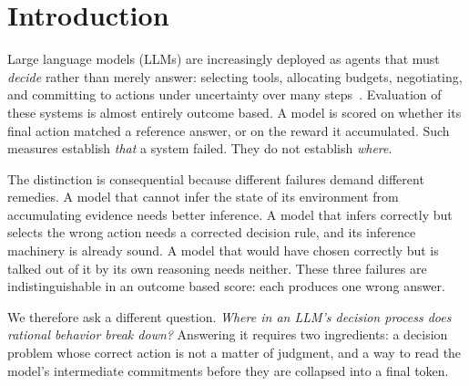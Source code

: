 %

\section{Introduction}

Large language models (LLMs) are increasingly deployed as agents that must
\emph{decide} rather than merely answer: selecting tools, allocating budgets,
negotiating, and committing to actions under uncertainty over many
steps~\citep{VERIFY_llm_agents_survey}. Evaluation of these systems is almost
entirely outcome based. A model is scored on whether its final action matched a
reference answer, or on the reward it accumulated. Such measures establish
\emph{that} a system failed. They do not establish \emph{where}.

The distinction is consequential because different failures demand different
remedies. A model that cannot infer the state of its environment from
accumulating evidence needs better inference. A model that infers correctly but
selects the wrong action needs a corrected decision rule, and its inference
machinery is already sound. A model that would have chosen correctly but is
talked out of it by its own reasoning needs neither. These three failures are
indistinguishable in an outcome based score: each produces one wrong answer.

We therefore ask a different question. \emph{Where in an LLM's decision process
does rational behavior break down?} Answering it requires two ingredients: a
decision problem whose correct action is not a matter of judgment, and a way to
read the model's intermediate commitments before they are collapsed into a
final token.

